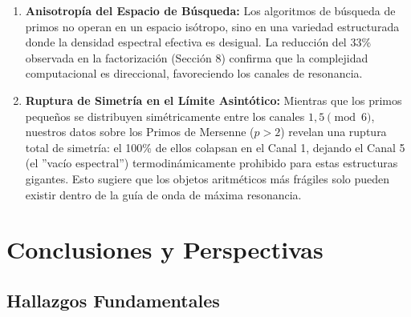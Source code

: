 \documentclass[12pt, a4paper]{article}
\theoremstyle{plain}
\theoremstyle{definition}
\begin{document}
\begin{enumerate}
    \item \textbf{Anisotropía del Espacio de Búsqueda:} Los algoritmos de búsqueda de primos no operan en un espacio isótropo, sino en una variedad estructurada donde la densidad espectral efectiva es desigual. La reducción del 33\% observada en la factorización (Sección 8) confirma que la complejidad computacional es direccional, favoreciendo los canales de resonancia.
    
    \item \textbf{Ruptura de Simetría en el Límite Asintótico:} Mientras que los primos pequeños se distribuyen simétricamente entre los canales $1, 5 \pmod 6$, nuestros datos sobre los Primos de Mersenne ($p>2$) revelan una ruptura total de simetría: el 100\% de ellos colapsan en el Canal 1, dejando el Canal 5 (el ''vacío espectral'') termodinámicamente prohibido para estas estructuras gigantes. Esto sugiere que los objetos aritméticos más frágiles solo pueden existir dentro de la guía de onda de máxima resonancia.
\end{enumerate}

\section{Conclusiones y Perspectivas}

\subsection{Hallazgos Fundamentales}
\end{document}
